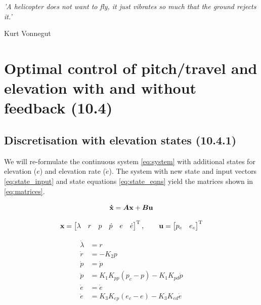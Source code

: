 \epigraph{\textit{'A helicopter does not want to fly, it just vibrates so much that the ground rejects it.'}}{Kurt Vonnegut}

\section{Optimal control of pitch/travel and elevation with and without feedback (10.4)}

\subsection{Discretisation with elevation states (10.4.1)} \label{10.4.1}
We will re-formulate the continuous system \eqref{eq:system} with additional states for elevation ($e$) and elevation rate ($\dot{e}$). The system with new state and input vectors \eqref{eq:state_input} and state equations \eqref{eq:state_eqns} yield the matrices shown in \eqref{eq:matrices}.

\begin{equation}\label{eq:system}
	\mathbf{\dot{x}}	= \bm{A} \mathbf{x} + \bm{B} \mathbf{u}
\end{equation}

\begin{equation}\label{eq:state_input}
	\mathbf{x} =
	\begin{bmatrix}
		\lambda & r & p & \dot{p} & e & \dot{e}
	\end{bmatrix}^{\text{T}}
	,\qquad
	\mathbf{u} =
	\begin{bmatrix}
		p_{c} & e_{c}
	\end{bmatrix}^{\text{T}}
\end{equation}

\begin{equation}\label{eq:state_eqns}
\begin{aligned}
	\dot{\lambda}	&= r \\
	\dot{r} 		&= - K_{2} p \\
	\dot{p}			&= \dot{p} \\
	\ddot{p}		&= K_{1} K_{pp} (p_{c} - p) - K_{1} K_{pd} \dot{p} \\
	\dot{e}			&= \dot{e} \\
	\ddot{e}		&= K_{3} K_{ep} (e_{c} - e) - K_{3} K_{ed} \dot{e}
\end{aligned}
\end{equation}

